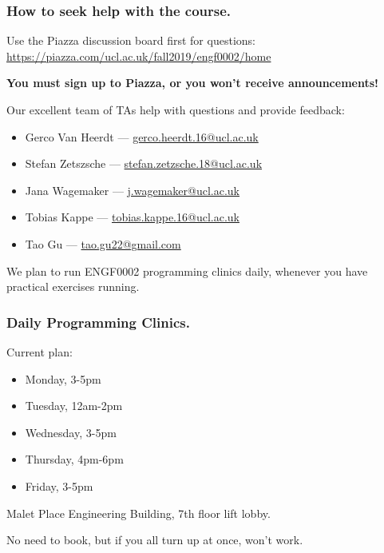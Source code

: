 \documentclass{beamer} %
\newcommand\emc[1]{\textcolor{midred}{\textbf{#1}}}
\begin{document}
\begin{frame}
\frametitle{How to seek help with the course.} 

Use the Piazza discussion board first for questions:\\
\url{https://piazza.com/ucl.ac.uk/fall2019/engf0002/home}

\vspace{1mm}
\emc{You must sign up to Piazza, or you won't receive announcements!}


\vspace{3mm}
Our excellent team of TAs help with questions and provide feedback:
\begin{itemize}
\item Gerco Van Heerdt --- \url{gerco.heerdt.16@ucl.ac.uk}
\item Stefan Zetszsche --- \url{stefan.zetzsche.18@ucl.ac.uk}
\item Jana Wagemaker --- \url{j.wagemaker@ucl.ac.uk}
\item Tobias Kappe --- \url{tobias.kappe.16@ucl.ac.uk}
\item Tao Gu --- \url{tao.gu22@gmail.com}
\end{itemize}

We plan to run ENGF0002 programming clinics daily, whenever you have practical
exercises running.
\end{frame}

\begin{frame}
  \frametitle{Daily Programming Clinics.}

  Current plan:
  \begin{itemize}
  \item Monday, 3-5pm
  \item Tuesday, 12am-2pm
  \item Wednesday, 3-5pm
  \item Thursday, 4pm-6pm
  \item Friday, 3-5pm
  \end{itemize}

  Malet Place Engineering Building, 7th floor lift lobby.

  No need to book, but if you all turn up at once, won't work.
\end{frame}
\end{document}
